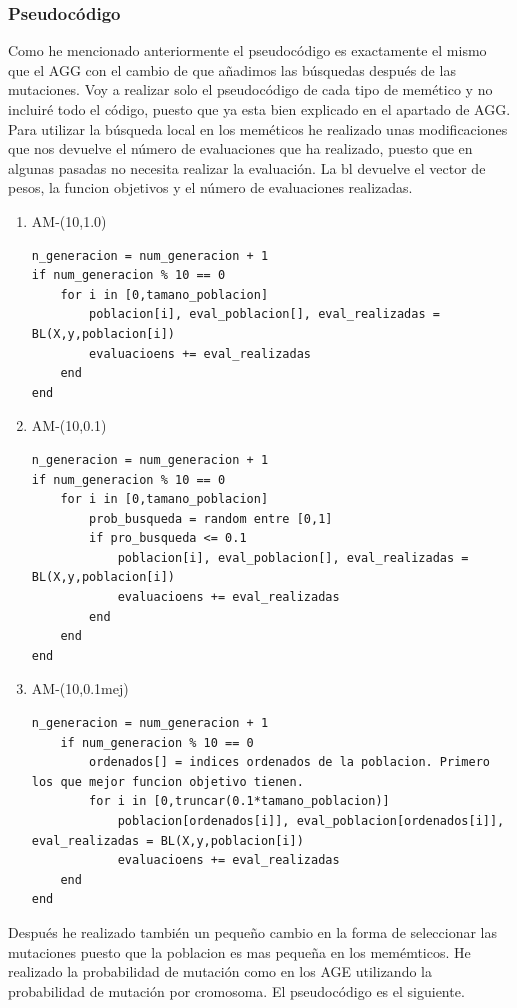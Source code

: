 \documentclass[titlepage]{article}
\begin{document}
	\subsubsection{Pseudocódigo}
	Como he mencionado anteriormente el pseudocódigo es exactamente el mismo que el AGG con el cambio de que añadimos las búsquedas después de las mutaciones. Voy a realizar solo el pseudocódigo de cada tipo de memético y no incluiré todo el código, puesto que ya esta bien explicado en el apartado de AGG. Para utilizar la búsqueda local en los meméticos he realizado unas modificaciones que nos devuelve el número de evaluaciones que ha realizado, puesto que en algunas pasadas no necesita realizar la evaluación. La bl devuelve el vector de pesos, la funcion objetivos y el número de evaluaciones realizadas.
	

	
	\begin{enumerate}
		\item AM-(10,1.0)
		\begin{lstlisting}
n_generacion = num_generacion + 1
if num_generacion % 10 == 0
	for i in [0,tamano_poblacion]
		poblacion[i], eval_poblacion[], eval_realizadas = BL(X,y,poblacion[i])
		evaluacioens += eval_realizadas 
	end
end
		\end{lstlisting}
		\item AM-(10,0.1)
		\begin{lstlisting}
n_generacion = num_generacion + 1
if num_generacion % 10 == 0
	for i in [0,tamano_poblacion]
		prob_busqueda = random entre [0,1]
		if pro_busqueda <= 0.1
			poblacion[i], eval_poblacion[], eval_realizadas = BL(X,y,poblacion[i])
			evaluacioens += eval_realizadas 
		end
	end
end
		\end{lstlisting}
		\item AM-(10,0.1mej)
		\begin{lstlisting}
n_generacion = num_generacion + 1
	if num_generacion % 10 == 0
		ordenados[] = indices ordenados de la poblacion. Primero los que mejor funcion objetivo tienen. 
		for i in [0,truncar(0.1*tamano_poblacion)]
			poblacion[ordenados[i]], eval_poblacion[ordenados[i]], eval_realizadas = BL(X,y,poblacion[i])
			evaluacioens += eval_realizadas 
	end
end
		\end{lstlisting}
	
	\end{enumerate}
	
	Después he realizado también un pequeño cambio en la forma de seleccionar las mutaciones puesto que la poblacion es mas pequeña en los memémticos. He realizado la probabilidad de mutación como en los AGE utilizando la probabilidad de mutación por cromosoma. El pseudocódigo es el siguiente.
	
\end{document}
